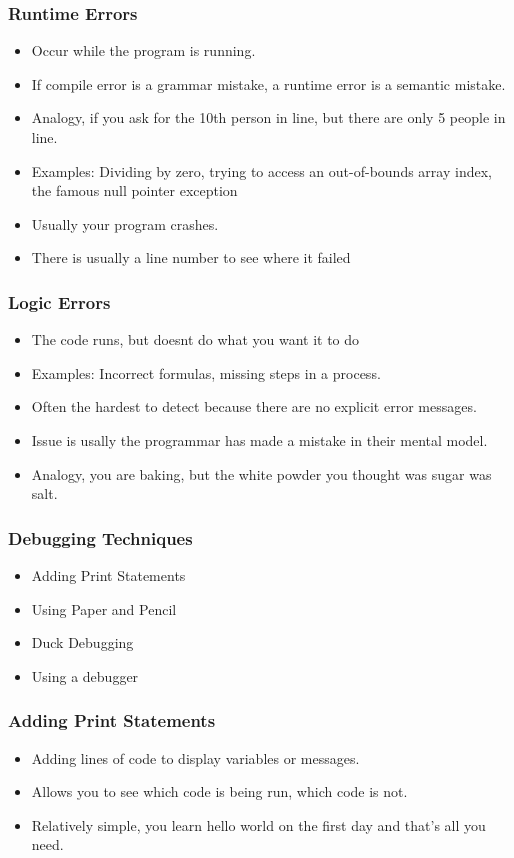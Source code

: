 \documentclass[aspectratio=169,hyperref={unicode}]{beamer}
\begin{document}
\begin{frame}
\frametitle{Runtime Errors}
\begin{itemize}
\item Occur while the program is running.
  \item If compile error is a grammar mistake, a runtime error is a semantic mistake.
        \item Analogy, if you ask for the 10th person in line, but there are only 5 people in line.
\item Examples: Dividing by zero, trying to access an out-of-bounds array index, the famous null pointer exception
\item Usually your program crashes.
\item There is usually a line number to see where it failed
\end{itemize}
\end{frame}

\begin{frame}
\frametitle{Logic Errors}
\begin{itemize}
\item The code runs, but doesnt do what you want it to do
\item Examples: Incorrect formulas, missing steps in a process.
\item Often the hardest to detect because there are no explicit error messages.
        \item Issue is usally the programmar has made a mistake in their mental model.
        \item Analogy, you are baking, but the white powder you thought was sugar was salt.
\end{itemize}
\end{frame}

\begin{frame}
\frametitle{Debugging Techniques}
\begin{itemize}
\item Adding Print Statements
\item Using Paper and Pencil
\item Duck Debugging
        \item Using a debugger
\end{itemize}
\end{frame}

\begin{frame}
\frametitle{Adding Print Statements}
\begin{itemize}
\item Adding lines of code to display variables or messages.
  \item Allows you to see which code is being run, which code is not.
    \item  Relatively simple, you learn hello world on the first day and that's all you need.
\end{itemize}
\end{frame}
\end{document}
